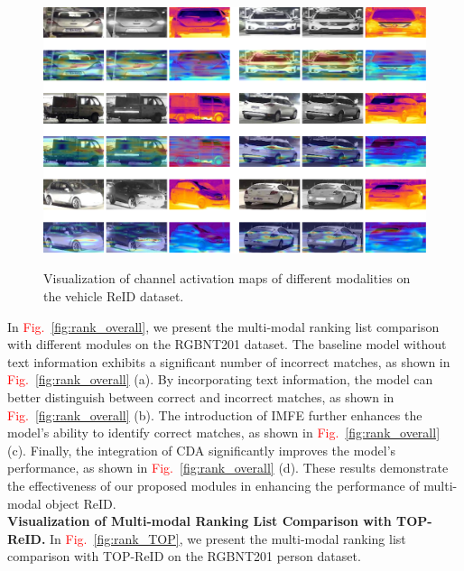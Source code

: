 \begin{figure}[t]
  \centering
    \resizebox{0.475\textwidth}{!}
    {
  \includegraphics[width=30.\linewidth]{sec/supp_img/SUPP_ACT_MAP_Vehicle.pdf}
  }
  \vspace{-6mm}
   \caption{Visualization of channel activation maps of different modalities on the vehicle ReID dataset.}
  \label{fig:channel_act_vehicle}
  \vspace{-4mm}
\end{figure}
In \textcolor{red}{Fig.}~\ref{fig:rank_overall}, we present the multi-modal ranking list comparison with different modules on the RGBNT201 dataset.
%
The baseline model without text information exhibits a significant number of incorrect matches, as shown in \textcolor{red}{Fig.}~\ref{fig:rank_overall} (a).
%
By incorporating text information, the model can better distinguish between correct and incorrect matches, as shown in \textcolor{red}{Fig.}~\ref{fig:rank_overall} (b).
%
The introduction of IMFE further enhances the model's ability to identify correct matches, as shown in \textcolor{red}{Fig.}~\ref{fig:rank_overall} (c).
%
Finally, the integration of CDA significantly improves the model's performance, as shown in \textcolor{red}{Fig.}~\ref{fig:rank_overall} (d).
%
These results demonstrate the effectiveness of our proposed modules in enhancing the performance of multi-modal object ReID.
\\
\textbf{Visualization of Multi-modal Ranking List Comparison with TOP-ReID.}
In \textcolor{red}{Fig.}~\ref{fig:rank_TOP}, we present the multi-modal ranking list comparison with TOP-ReID on the RGBNT201 person dataset.
